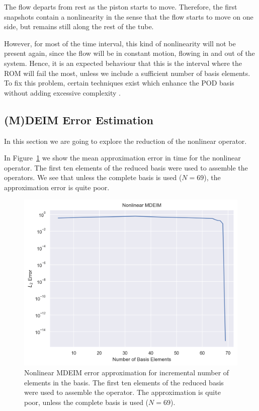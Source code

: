 \documentclass[../../thesis.tex]{subfiles}
\begin{document}
The flow departs from rest as the piston starts to move.
Therefore, the first snapshots contain a nonlinearity in the sense that the flow starts to move on one side, 
but remains still along the rest of the tube.

However, for most of the time interval, this kind of nonlinearity will not be present again,
since the flow will be in constant motion, flowing in and out of the system.
Hence, it is an expected behaviour that this is the interval where the ROM will fail the most,
unless we include a sufficient number of basis elements.
To fix this problem, certain techniques exist which enhance the POD basis 
without adding excessive complexity \cite{weightedPOD}.

\subsection{(M)DEIM Error Estimation}
In this section we are going to explore the reduction of the nonlinear operator.

In Figure~\ref{fig:mdeim_error_approximation} we show the mean approximation error
in time for the nonlinear operator. 
The first ten elements of the reduced basis were used to assemble the operators.
We see that unless the complete basis is used ($N=69$),
the approximation error is quite poor.
\begin{figure}[h]
    \centering
    \includegraphics[width=1\columnwidth]{research_project/piston/figures/mdeim_certification/nonlinear_error_decay.png}
    \caption{Nonlinear MDEIM error approximation for incremental number of elements in the basis.
    The first ten elements of the reduced basis were used to assemble the operator.
    The approximation is quite poor, unless the complete basis is used 
    ($N=69$).}
    \label{fig:mdeim_error_approximation}
\end{figure}
\end{document}
